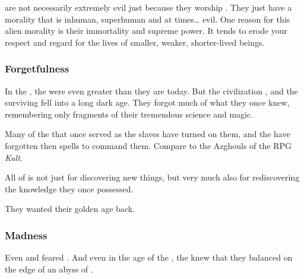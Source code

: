 \Dragons{} are not necessarily extremely evil just because they worship \xss. 
They just have a morality that is inhuman, superhuman and at times\ldots{} evil. 
One reason for this alien morality is their immortality and supreme power. 
It tends to erode your respect and regard for the lives of smaller, weaker, shorter-lived beings.




\subsubsection{Forgetfulness}
In the ,
the \dragons{} were even greater than they are today. 
But the \ophidian{} civilization , and the surviving \ophidians{} fell into a long dark age. 
They forgot much of what they once knew, remembering only fragments of their tremendous science and magic.  

Many of the \daemons{} that once served as the \psp{\dragons}{} slaves have turned on them, and the \dragons{} have forgotten then spells to command them. 
Compare to the Azghouls of the RPG \emph{Kult}. 

All of  is not just for discovering new things, but very much also for rediscovering the knowledge they once possessed. 

They wanted their golden age back.






\subsubsection{Madness}
Even \Sethicus and \Tiamat{} feared . 
And even in the age of the \thirdbanewar, the \dragons{} knew that they balanced on the edge of an abyss of . 

